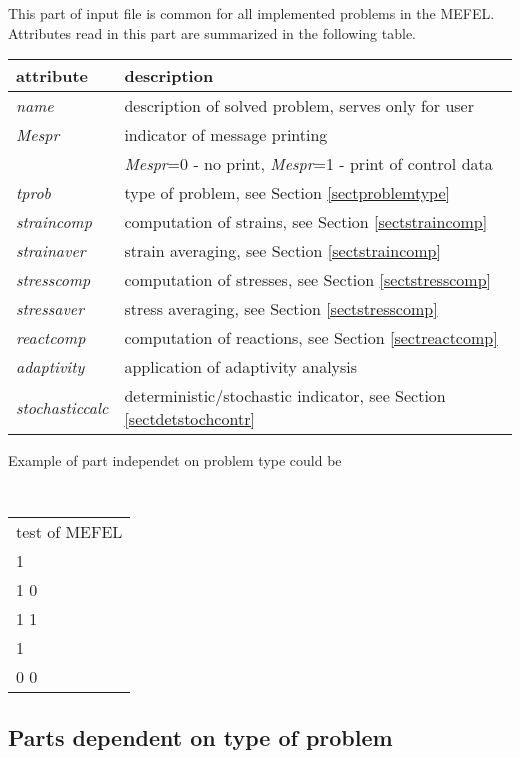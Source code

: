 This part of input file is common for all implemented problems in the MEFEL. Attributes read
in this part are summarized in the following table.

\begin{center}
\begin{tabular}{|l|l|}
\hline
attribute & description
\\ \hline
{\it name} & description of solved problem, serves only for user
\\
{\it Mespr} & indicator of message printing
\\
 & {\it Mespr}=0 - no print, {\it Mespr}=1 - print of control data
\\
{\it tprob} & type of problem, see Section \ref{sectproblemtype}
\\
{\it straincomp} & computation of strains, see Section \ref{sectstraincomp}
\\
{\it strainaver} & strain averaging, see Section \ref{sectstraincomp}
\\
{\it stresscomp} & computation of stresses, see Section \ref{sectstresscomp}
\\
{\it stressaver} & stress averaging, see Section \ref{sectstresscomp}
\\
{\it reactcomp} & computation of reactions, see Section \ref{sectreactcomp}
\\
{\it adaptivity} & application of adaptivity analysis
\\
{\it stochasticcalc} & deterministic/stochastic indicator, see Section \ref{sectdetstochcontr}
\\ \hline
\end{tabular}
\end{center}

Example of part independet on problem type could be

\begin{center}
{\tt
\begin{tabular}{l}
test of MEFEL
\\
1
\\
1 0
\\
1 1
\\
1
\\
0 0
\\
\end{tabular}
}
\end{center}



\subsection{Parts dependent on type of problem}

